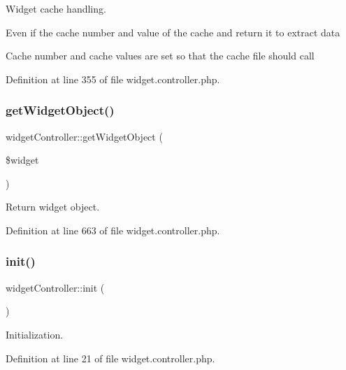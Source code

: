 Widget cache handling. 

Even if the cache number and value of the cache and return it to extract data

Cache number and cache values are set so that the cache file should call

Definition at line 355 of file widget.\+controller.\+php.

\hypertarget{classwidgetController_a15059522aa8548d03668025d20d6d152}{}\label{classwidgetController_a15059522aa8548d03668025d20d6d152} 
\subsubsection{\texorpdfstring{get\+Widget\+Object()}{getWidgetObject()}}
{\footnotesize\ttfamily widget\+Controller\+::get\+Widget\+Object (\begin{DoxyParamCaption}\item[{}]{\$widget }\end{DoxyParamCaption})}



Return widget object. 



Definition at line 663 of file widget.\+controller.\+php.

\hypertarget{classwidgetController_aa76890b678d4f18898dc1bed68730eae}{}\label{classwidgetController_aa76890b678d4f18898dc1bed68730eae} 
\subsubsection{\texorpdfstring{init()}{init()}}
{\footnotesize\ttfamily widget\+Controller\+::init (\begin{DoxyParamCaption}{ }\end{DoxyParamCaption})}



Initialization. 



Definition at line 21 of file widget.\+controller.\+php.

\hypertarget{classwidgetController_a79adfc9bc627022de039909a2139d510}{}\label{classwidgetController_a79adfc9bc627022de039909a2139d510} 
